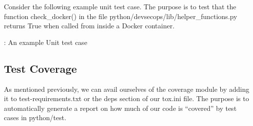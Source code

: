 \justifying
Consider the following example unit test case. The purpose is to test
that the function check\_docker() in the file python/devsecops/lib/helper\_functions.py 
returns True when called from inside a Docker container.

\begin{mybox}{\thetcbcounter: An example Unit test case}
  
\end{mybox}

\subsection{Test Coverage}

\justifying
As mentioned previously, we can avail ourselves of the coverage module by adding it to test-requirements.txt or
the deps section of our tox.ini file. The purpose is to automatically generate a report on how much of our code
is ``covered'' by test cases in python/test.
